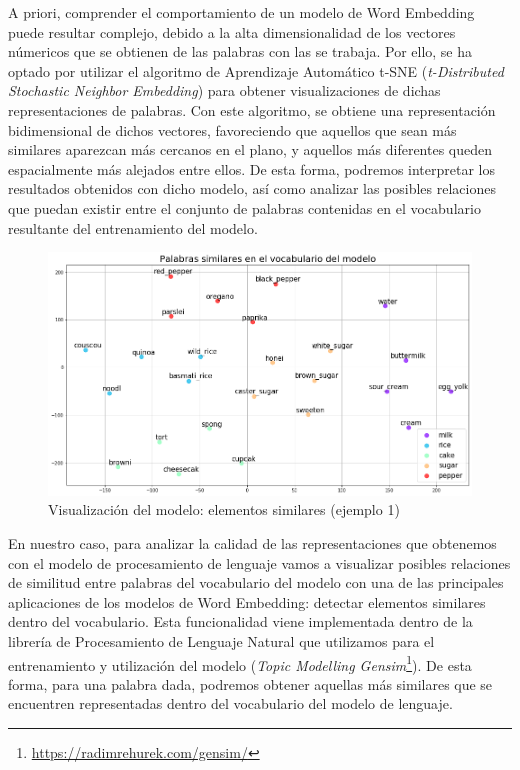 A priori, comprender el comportamiento de un modelo de Word Embedding puede resultar complejo, debido a la alta dimensionalidad de los vectores númericos que se obtienen de las palabras con las se trabaja. Por ello, se ha optado por utilizar el algoritmo de Aprendizaje Automático t-SNE (\textit{t-Distributed Stochastic Neighbor Embedding}) para obtener visualizaciones de dichas representaciones de palabras. Con este algoritmo, se obtiene una representación bidimensional de dichos vectores, favoreciendo que aquellos que sean más similares aparezcan más cercanos en el plano, y aquellos más diferentes queden espacialmente más alejados entre ellos. De esta forma, podremos interpretar los resultados obtenidos con dicho modelo, así como analizar las posibles relaciones que puedan existir entre el conjunto de palabras contenidas en el vocabulario resultante del entrenamiento del modelo.

\begin{figure}[H]
    \centering
    \includegraphics[width=1.0\textwidth]{imagenes/resultados/word-embedding-2.png}
    \caption{Visualización del modelo: elementos similares (ejemplo 1)}
    \label{fig:wordembedding_vis1}
\end{figure} 

En nuestro caso, para analizar la calidad de las representaciones que obtenemos con el modelo de procesamiento de lenguaje vamos a visualizar posibles relaciones de similitud entre palabras del vocabulario del modelo con una de las principales aplicaciones de los modelos de Word Embedding: detectar elementos similares dentro del vocabulario. Esta funcionalidad viene implementada dentro de la librería de Procesamiento de Lenguaje Natural que utilizamos para el entrenamiento y utilización del modelo (\textit{Topic Modelling  Gensim}\footnote{\url{https://radimrehurek.com/gensim/}}). De esta forma, para una palabra dada, podremos obtener aquellas más similares que se encuentren representadas dentro del vocabulario del modelo de lenguaje.

